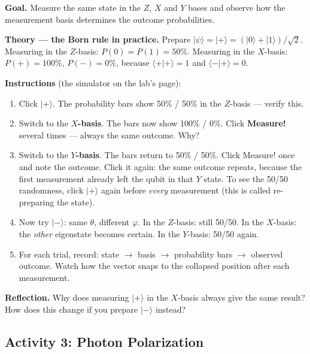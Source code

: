 \documentclass[a4paper,11pt]{article}
\newcommand{\keepspace}[1]{\par\vspace{0pt plus #1}\penalty-300\vspace{0pt plus -#1}}
\providecommand{\ket}[1]{|{#1}\rangle}
\providecommand{\braket}[2]{\langle{#1}|{#2}\rangle}
\begin{document}
\begin{studentbox}
\textbf{Goal.} Measure the same state in the $Z$, $X$ and $Y$ bases and observe how the
measurement basis determines the outcome probabilities.

\medskip
\textbf{Theory --- the Born rule in practice.} Prepare
$\ket{\psi} = \ket{+} = (\ket{0} + \ket{1})/\sqrt 2$. Measuring in the $Z$-basis:
$P(0) = P(1) = 50\%$. Measuring in the $X$-basis: $P(+) = 100\%$, $P(-) = 0\%$, because
$\braket{+}{+} = 1$ and $\braket{-}{+} = 0$.

\medskip
\textbf{Instructions} (the simulator on the lab's page):
\begin{enumerate}
    \item Click $\ket{+}$. The probability bars show 50\% / 50\% in the $Z$-basis ---
          verify this.
    \item Switch to the \textbf{$X$-basis}. The bars now show 100\% / 0\%. Click
          \textbf{Measure!} several times --- always the same outcome. Why?
    \item Switch to the \textbf{$Y$-basis}. The bars return to 50\% / 50\%. Click
          Measure! once and note the outcome. Click it again: the same outcome repeats,
          because the first measurement already left the qubit in that $Y$ state. To see
          the 50/50 randomness, click $\ket{+}$ again before \emph{every} measurement
          (this is called re-preparing the state).
    \item Now try $\ket{-}$: same $\theta$, different $\varphi$. In the $Z$-basis: still
          50/50. In the $X$-basis: the \emph{other} eigenstate becomes certain. In the
          $Y$-basis: 50/50 again.
    \item For each trial, record: state $\to$ basis $\to$ probability bars $\to$ observed
          outcome. Watch how the vector snaps to the collapsed position after each
          measurement.
\end{enumerate}

\textbf{Reflection.} Why does measuring $\ket{+}$ in the $X$-basis always give the same
result? How does this change if you prepare $\ket{-}$ instead?
\end{studentbox}

\keepspace{8\baselineskip}
\subsection{Activity 3: Photon Polarization}
\end{document}
